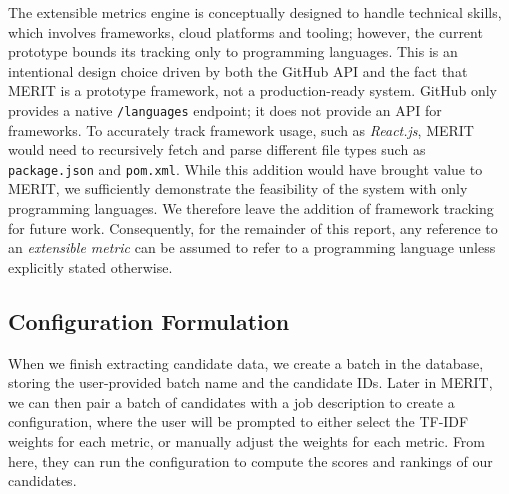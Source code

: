 The extensible metrics engine is conceptually designed to handle technical skills, which involves frameworks, cloud platforms and tooling; however, the current
prototype bounds its tracking only to programming languages. This is an intentional design choice driven by both the GitHub API and the fact that MERIT is
a prototype framework, not a production-ready system. GitHub only provides a native \texttt{/languages} endpoint; it does not provide an API for frameworks.
To accurately track framework usage, such as \textit{React.js}, MERIT would need to recursively fetch and parse different file types such as \texttt{package.json} and \texttt{pom.xml}.
While this addition would have brought value to MERIT, we sufficiently demonstrate the feasibility of the system with only programming languages. We therefore leave
the addition of framework tracking for future work. Consequently, for the remainder of this report, any reference to an \textit{extensible metric} can be assumed to refer to a programming language unless explicitly stated otherwise.

\subsection{Configuration Formulation}
When we finish extracting candidate data, we create a batch in the database, storing the user-provided batch name and the candidate IDs.
Later in MERIT, we can then pair a batch of candidates with a job description to create a configuration, where the user will be prompted to
either select the TF-IDF weights for each metric, or manually adjust the weights for each metric. From here, they can run the configuration to
compute the scores and rankings of our candidates.
